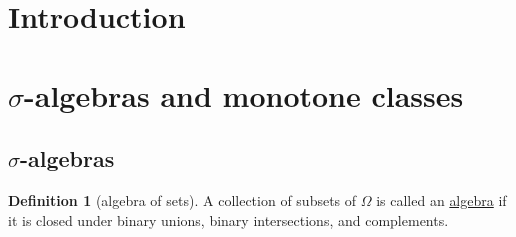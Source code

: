 \documentclass[a4paper]{scrartcl}
\newcommand{\defn}[1]{\ul{#1}}
\theoremstyle{definition}
\newtheorem{definition}{Definition}[section]
\theoremstyle{plain}
\theoremstyle{remark}
\begin{document}
\tableofcontents
\section{Introduction}
%
%
%
%
%
%
%
%
%
%

\section{\texorpdfstring{$\sigma$}{Lg}-algebras and monotone classes}
\subsection{\texorpdfstring{$\sigma$}{Lg}-algebras}
\begin{definition}[algebra of sets]
  \label{def:algebraofsets}
  A collection of subsets of $\Omega$ is called an \defn{algebra} if it is closed under binary unions, binary intersections, and complements.
\end{definition}
\end{document}
